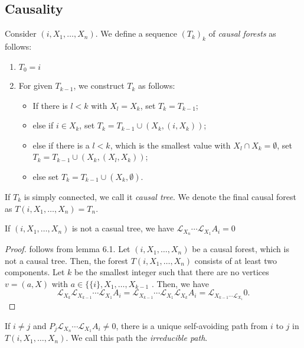 \subsection{Causality}


\begin{defn}
  Consider \((i,X_1, \dots, X_n)\). We define a sequence \((T_k)_k\) of \emph{causal forests} as follows:
  \begin{enumerate}[1.]
    \item \(T_0={i}\)
    \item For given \(T_{k-1}\), we construct \(T_k\) as follows:
      \begin{itemize}
        \item If there is \(l< k\) with \(X_l=X_k\), set \(T_k=T_{k-1}\);
        \item else if \(i \in X_k\), set \(T_k=T_{k-1} \cup (X_k, (i,X_k))\);
        \item else if there is a \(l <k\), which is the smallest value with \(X_l \cap X_k= \emptyset \), set \(T_k=T_{k-1} \cup (X_k, (X_l, X_k))\);
        \item else set \(T_k=T_{k-1}\cup (X_k, \emptyset )\).
      \end{itemize}   
  \end{enumerate}
  If \(T_k\) is simply connected, we call it \emph{causal tree}. We denote the final causal forest as \(T(i, X_1,\dots, X_n)=T_n\).
\end{defn}


\begin{lem}
    If \((i, X_1, \dots, X_n)\) is not a casual tree, we have \(\mathcal{L}_{X_n}\cdots \mathcal{L}_{X_1}A_i=0\)
\end{lem}

\begin{proof}
  follows from lemma 6.1. Let \((i, X_1, \dots, X_n)\) be a causal forest, which is not a causal tree. Then, the forest \(T(i,X_1,\dots,X_n)\) consists of at least two components. Let \(k\) be the smallest integer such that there are no vertices \(v=(a,X)\) with \(a\in \{\{i\},X_1,\dots,X_{k-1}\) . Then, we have \[\mathcal{L}_{X_k}\mathcal{L}_{X_{k-1}}\cdots \mathcal{L}_{X_1}A_i=\mathcal{L}_{X_{k-1}}\cdots \mathcal{L}_{X_1}\mathcal{L}_{X_k}A_i= \mathcal{L}_{X_{k-1}\cdots \mathcal{L}_{X_1}}0.\]
\end{proof}


\begin{lem}
    If \(i \neq j\) and \(P_j \mathcal{L}_{X_n}\cdots \mathcal{L}_{X_1}A_i\neq 0\), there is a unique self-avoiding path from \(i\) to \(j\) in \(T(i, X_1, \dots, X_n)\). We call this path the \emph{irreducible path}.
\end{lem}


